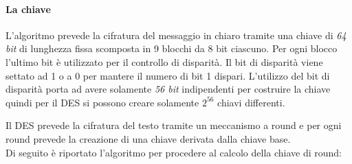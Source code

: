 \documentclass[11pt, a4paper, oneside]{Thesis} %
\begin{document}
\paragraph{La chiave}L'algoritmo prevede la cifratura del messaggio in chiaro tramite una chiave di \textit{64 bit} di lunghezza fissa scomposta in 9 blocchi da 8 bit ciascuno.
Per ogni blocco l'ultimo bit è utilizzato per il controllo di disparità. Il bit di disparità viene settato ad 1 o a 0 per mantere il numero di bit 1 dispari.
L'utilizzo del bit di disparità porta ad avere solamente \textit{56 bit} indipendenti per costruire la chiave quindi per il DES si possono creare solamente $2^{56}$ chiavi differenti.
\par Il DES prevede la cifratura del testo tramite un meccanismo a round e per ogni round prevede la creazione di una chiave derivata dalla chiave base.
\\Di seguito è riportato l'algoritmo per procedere al calcolo della chiave di round:
\end{document}
